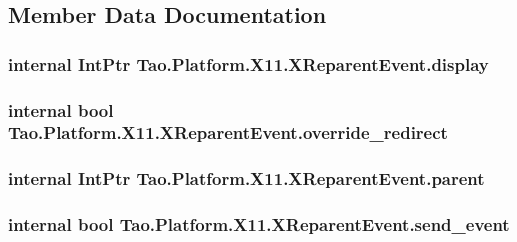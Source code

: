 \subsection{Member Data Documentation}
\hypertarget{struct_tao_1_1_platform_1_1_x11_1_1_x_reparent_event_a838fa361aa318f9a3cd5c011330e52e6}{
\subsubsection[{display}]{\setlength{\rightskip}{0pt plus 5cm}internal IntPtr {\bf Tao.Platform.X11.XReparentEvent.display}}}
\label{struct_tao_1_1_platform_1_1_x11_1_1_x_reparent_event_a838fa361aa318f9a3cd5c011330e52e6}
\hypertarget{struct_tao_1_1_platform_1_1_x11_1_1_x_reparent_event_ac56eddb0d5cbe75d709ffe57f6d9a735}{
\subsubsection[{override\_\-redirect}]{\setlength{\rightskip}{0pt plus 5cm}internal bool {\bf Tao.Platform.X11.XReparentEvent.override\_\-redirect}}}
\label{struct_tao_1_1_platform_1_1_x11_1_1_x_reparent_event_ac56eddb0d5cbe75d709ffe57f6d9a735}
\hypertarget{struct_tao_1_1_platform_1_1_x11_1_1_x_reparent_event_aa2b6e20899b718f9bf5f3b36beb9ebb9}{
\subsubsection[{parent}]{\setlength{\rightskip}{0pt plus 5cm}internal IntPtr {\bf Tao.Platform.X11.XReparentEvent.parent}}}
\label{struct_tao_1_1_platform_1_1_x11_1_1_x_reparent_event_aa2b6e20899b718f9bf5f3b36beb9ebb9}
\hypertarget{struct_tao_1_1_platform_1_1_x11_1_1_x_reparent_event_a20d86b17ee7ac09e632fc142ebe7663e}{
\subsubsection[{send\_\-event}]{\setlength{\rightskip}{0pt plus 5cm}internal bool {\bf Tao.Platform.X11.XReparentEvent.send\_\-event}}}
